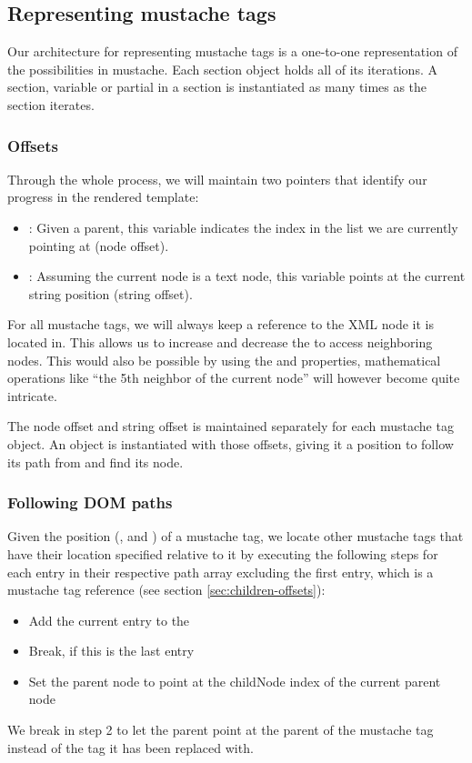 \documentclass[thesis.tex]{subfiles}
\begin{document}
\subsection{Representing mustache tags}
Our architecture for representing mustache tags is a one-to-one representation
of the possibilities in mustache.
Each section object holds all of its iterations. A section, variable or partial
in a section is instantiated as many times as the section iterates.

\subsubsection{Offsets}
Through the whole process, we will maintain two pointers that identify our
progress in the rendered template:
\begin{itemize}
\item {}: Given a parent, this variable indicates the index
      in the  list we are currently pointing at (node offset).
\item {}: Assuming the current node is a text node, this variable
      points at the current string position (string offset).
\end{itemize}

For all mustache tags, we will always keep a reference to the 
XML node it is located in. This allows us to increase and decrease the
 to access neighboring nodes. This would also be possible by
using the  and  properties,
mathematical operations like ``the 5th neighbor of the current node'' will
however become quite intricate.

The node offset and string offset is maintained separately for each mustache tag
object. An object is instantiated with those offsets, giving it a position to
follow its path from and find its node.

\subsubsection{Following DOM paths}
Given the position (,  and )
of a mustache tag, we locate other mustache tags that have their location
specified relative to it by executing the following steps for each entry in
their respective path array
excluding the first entry, which is a mustache tag reference
(see section \ref{sec:children-offsets}):
\begin{itemize}
\item Add the current entry to the 
\item Break, if this is the last entry
\item Set the parent node to point at the childNode index  of
      the current parent node
\end{itemize}
We break in step 2 to let the parent point at the parent of the mustache tag
instead of the tag it has been replaced with.
\end{document}
